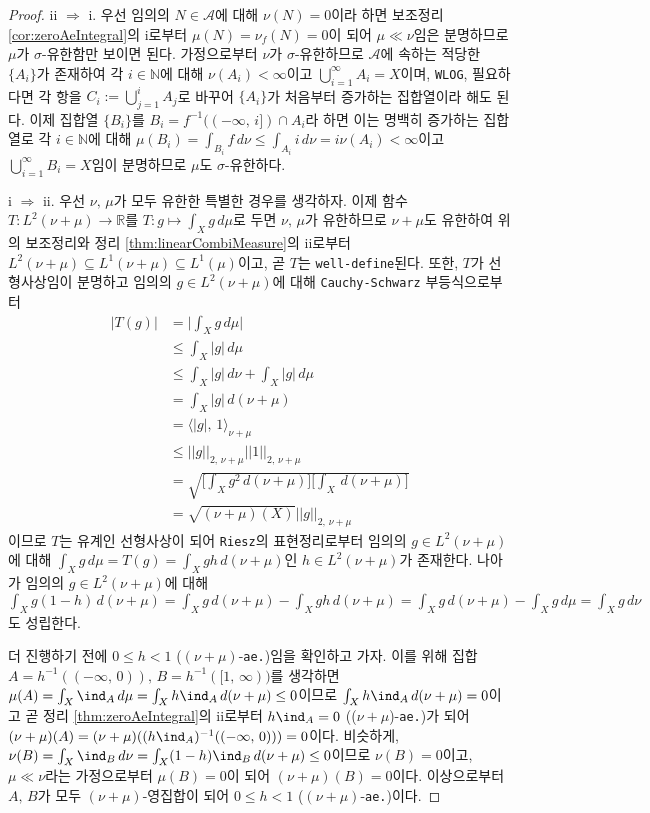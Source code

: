 \begin{proof}
    ii $\Rightarrow$ i. 우선 임의의 $N\in\mathcal{A}$에 대해 $\nu(N)=0$이라 하면 보조정리 \ref{cor:zeroAeIntegral}의 i로부터 $\mu(N)=\nu_f(N)=0$이 되어 $\mu\ll\nu$임은 분명하므로 $\mu$가 $\sigma$-유한함만 보이면 된다. 가정으로부터 $\nu$가 $\sigma$-유한하므로 $\mathcal{A}$에 속하는 적당한 $\{A_i\}$가 존재하여 각 $i\in\mathbb{N}$에 대해 $\nu(A_i)<\infty$이고 $\bigcup_{i=1}^\infty A_i=X$이며, \texttt{WLOG}, 필요하다면 각 항을 $C_i:=\bigcup_{j=1}^iA_j$로 바꾸어 $\{A_i\}$가 처음부터 증가하는 집합열이라 해도 된다. 이제 집합열 $\{B_i\}$를 $B_i=f^{-1}((-\infty,\,i])\cap A_i$라 하면 이는 명백히 증가하는 집합열로 각 $i\in\mathbb{N}$에 대해 $\mu(B_i)=\int_{B_i}f\,d\nu\leq\int_{A_i}i\,d\nu=i\nu(A_i)<\infty$이고 $\bigcup_{i=1}^\infty B_i=X$임이 분명하므로 $\mu$도 $\sigma$-유한하다.

    i $\Rightarrow$ ii. 우선 $\nu,\,\mu$가 모두 유한한 특별한 경우를 생각하자. 이제 함수 $T:L^2(\nu+\mu)\to\mathbb{R}$를 $T:g\mapsto\int_Xg\,d\mu$로 두면 $\nu,\,\mu$가 유한하므로 $\nu+\mu$도 유한하여 위의 보조정리와 정리 \ref{thm:linearCombiMeasure}의 ii로부터 $L^2(\nu+\mu)\subseteq L^1(\nu+\mu)\subseteq L^1(\mu)$이고, 곧 $T$는 \texttt{well-define}된다. 또한, $T$가 선형사상임이 분명하고 임의의 $g\in L^2(\nu+\mu)$에 대해 \texttt{Cauchy-Schwarz} 부등식으로부터
    \begin{align*}
        |T(g)|&=\bigg|\int_Xg\,d\mu\bigg|\\
        &\leq\int_X|g|\,d\mu\\
        &\leq\int_X|g|\,d\nu+\int_X|g|\,d\mu\\
        &=\int_X|g|\,d(\nu+\mu)\\
        &=\langle|g|,\,1\rangle_{\nu+\mu}\\
        &\leq||g||_{2,\,\nu+\mu}||1||_{2,\,\nu+\mu}\\
        &=\sqrt{\bigg[\int_Xg^2\,d(\nu+\mu)\bigg]\bigg[\int_X\,d(\nu+\mu)\bigg]}\\
        &=\sqrt{(\nu+\mu)(X)}||g||_{2,\,\nu+\mu}
    \end{align*}
    이므로 $T$는 유계인 선형사상이 되어 \texttt{Riesz}의 표현정리로부터 임의의 $g\in L^2(\nu+\mu)$에 대해 $\int_Xg\,d\mu=T(g)=\int_Xgh\,d(\nu+\mu)$인 $h\in L^2(\nu+\mu)$가 존재한다. 나아가 임의의 $g\in L^2(\nu+\mu)$에 대해 $\int_Xg(1-h)\,d(\nu+\mu)=\int_Xg\,d(\nu+\mu)-\int_Xgh\,d(\nu+\mu)=\int_Xg\,d(\nu+\mu)-\int_Xg\,d\mu=\int_Xg\,d\nu$도 성립한다.

    더 진행하기 전에 $0\leq h<1$ ($(\nu+\mu)$-\texttt{ae.})임을 확인하고 가자. 이를 위해 집합 $A=h^{-1}((-\infty,\,0)),\,B=h^{-1}([1,\,\infty))$를 생각하면 $\mu(A)=\int_X\ind_A\,d\mu=\int_Xh\ind_A\,d(\nu+\mu)\leq0$이므로 $\int_Xh\ind_A\,d(\nu+\mu)=0$이고 곧 정리 \ref{thm:zeroAeIntegral}의 ii로부터 $h\ind_A=0$ (($\nu+\mu$)-\texttt{ae.})가 되어 $(\nu+\mu)(A)=(\nu+\mu)((h\ind_A)^{-1}((-\infty,\,0)))=0$이다. 비슷하게, $\nu(B)=\int_X\ind_B\,d\nu=\int_X(1-h)\ind_B\,d(\nu+\mu)\leq0$이므로 $\nu(B)=0$이고, $\mu\ll\nu$라는 가정으로부터 $\mu(B)=0$이 되어 $(\nu+\mu)(B)=0$이다. 이상으로부터 $A,\,B$가 모두 $(\nu+\mu)$-영집합이 되어 $0\leq h<1$ ($(\nu+\mu)$-\texttt{ae.})이다.


\end{proof}

